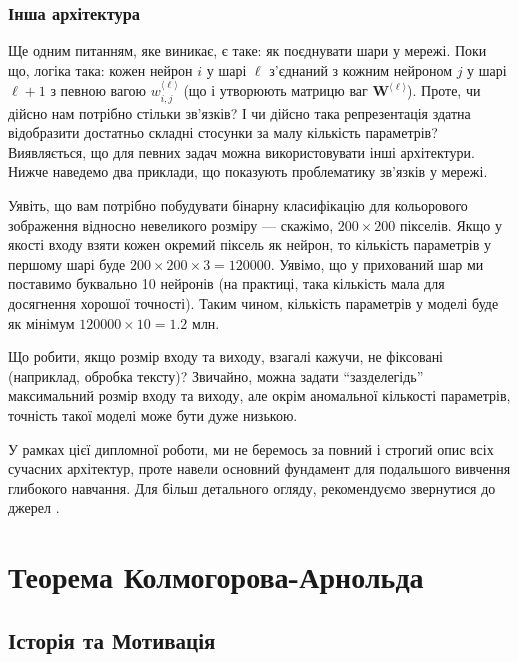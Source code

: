 \subsubsection{Інша архітектура}

Ще одним питанням, яке виникає, є таке: як поєднувати шари у мережі. Поки що,
логіка така: кожен нейрон $i$ у шарі $\ell$ з'єднаний з кожним нейроном $j$ у
шарі $\ell+1$ з певною вагою $w_{i,j}^{\langle \ell \rangle}$ (що і утворюють
матрицю ваг $\boldsymbol{W}^{\langle \ell \rangle}$). Проте, чи дійсно нам
потрібно стільки зв'язків? І чи дійсно така репрезентація здатна відобразити
достатньо складні стосунки за малу кількість параметрів? Виявляється, що для
певних задач можна використовувати інші архітектури. Нижче наведемо два
приклади, що показують проблематику зв'язків у мережі.

\begin{example}
	Уявіть, що вам потрібно побудувати бінарну класифікацію для кольорового
	зображення відносно невеликого розміру --- скажімо, $200 \times 200$
	пікселів. Якщо у якості входу взяти кожен окремий піксель як нейрон, то
	кількість параметрів у першому шарі буде $200 \times 200 \times 3 = 120000$.
	Уявімо, що у прихований шар ми поставимо буквально 10 нейронів (на практиці,
	така кількість мала для досягнення хорошої точності). Таким чином, кількість
	параметрів у моделі буде як мінімум $120000 \times 10 = 1.2$ млн. 
\end{example}

\begin{example}
	Що робити, якщо розмір входу та виходу, взагалі кажучи, не фіксовані 
	(наприклад, обробка тексту)? Звичайно, можна задати ``зазделегідь''
	максимальний розмір входу та виходу, але окрім аномальної кількості
	параметрів, точність такої моделі може бути дуже низькою.
\end{example}

У рамках цієї дипломної роботи, ми не беремось за повний і строгий опис всіх
сучасних архітектур, проте навели основний фундамент для подальшого вивчення
глибокого навчання. Для більш детального огляду, рекомендуємо звернутися до
джерел \cite{book-1,book-2}.

\section{Теорема Колмогорова-Арнольда}

\subsection{Історія та Мотивація}

